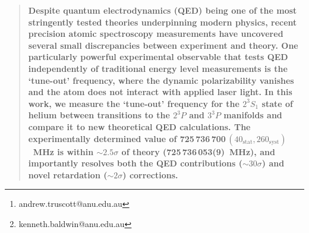 \documentclass[12pt]{article}
\newcommand{\MetastableState}{2^{3\!}S_1}%
\newcommand{\UpperStateManifold}{3^{3\!}P}%
\newcommand{\LowerStateManifold}{2^{3\!}P}%
\newenvironment{sciabstract}{%
\begin{quote} \bf}
{\end{quote}}
\begin{document}
\author[1]{A. G. Truscott \thanks{andrew.truscott@anu.edu.au}}
% 

\author[1]{K. G. H. Baldwin \thanks{kenneth.baldwin@anu.edu.au}}
% 

\date{\today}






\maketitle

\begin{sciabstract}
Despite quantum electrodynamics (QED) being one of the most stringently tested theories underpinning modern physics, recent precision atomic spectroscopy measurements have uncovered several small discrepancies between experiment and theory.  One particularly powerful experimental observable that tests QED independently of traditional energy level measurements is the `tune-out' frequency, where the dynamic polarizability vanishes and the atom does not interact with applied laser light.  In this work, we measure the `tune-out' frequency for the \(\MetastableState\) state of helium between transitions to the $\LowerStateManifold$ and $\UpperStateManifold$ manifolds and compare it to new theoretical QED calculations.  The experimentally determined value of 725\,736\,700\,$(40_{\mathrm{stat}},260_{\mathrm{syst}})$~MHz is within \({\sim} 2.5\sigma\) of theory (725\,736\,053(9)~MHz), and importantly resolves both the QED contributions (\({\sim} 30 \sigma\)) and novel retardation (\({\sim} 2 \sigma\)) corrections.
\end{sciabstract}
\end{document}

